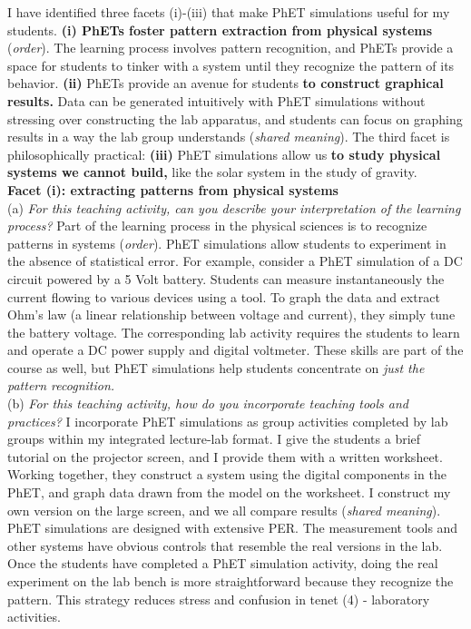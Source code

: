 \documentclass[../../../main.tex]{subfiles}
\begin{document}
I have identified three facets (i)-(iii) that make PhET simulations useful for my students. \textbf{(i) PhETs foster pattern extraction from physical systems} (\textit{order}).  The learning process involves pattern recognition, and PhETs provide a space for students to tinker with a system until they recognize the pattern of its behavior. \textbf{(ii)} PhETs provide an avenue for students \textbf{to construct graphical results.} Data can be generated intuitively with PhET simulations without stressing over constructing the lab apparatus, and students can focus on graphing results in a way the lab group understands (\textit{shared meaning}).  The third facet is philosophically practical: \textbf{(iii)} PhET simulations allow us \textbf{to study physical systems we cannot build,} like the solar system in the study of gravity.
\\
\vspace{0.15cm}
\textbf{Facet (i): extracting patterns from physical systems}
\\
\vspace{0.15cm}
(a) \textit{For this teaching activity, can you describe your interpretation of the learning process?} Part of the learning process in the physical sciences is to recognize patterns in systems (\textit{order}).  PhET simulations allow students to experiment in the absence of statistical error.  For example, consider a PhET simulation of a DC circuit powered by a 5 Volt battery.  Students can measure instantaneously the current flowing to various devices using a tool.  To graph the data and extract Ohm's law (a linear relationship between voltage and current), they simply tune the battery voltage.  The corresponding lab activity requires the students to learn and operate a DC power supply and digital voltmeter.  These skills are part of the course as well, but PhET simulations help students concentrate on \textit{just the pattern recognition.}
\\
\vspace{0.15cm}
(b) \textit{For this teaching activity, how do you incorporate teaching tools and practices?}  I incorporate PhET simulations as group activities completed by lab groups within my integrated lecture-lab format.  I give the students a brief tutorial on the projector screen, and I provide them with a written worksheet.  Working together, they construct a system using the digital components in the PhET, and graph data drawn from the model on the worksheet.  I construct my own version on the large screen, and we all compare results (\textit{shared meaning}).  PhET simulations are designed with extensive PER.  The measurement tools and other systems have obvious controls that resemble the real versions in the lab.  Once the students have completed a PhET simulation activity, doing the real experiment on the lab bench is more straightforward because they recognize the pattern.  This strategy reduces stress and confusion in tenet (4) - laboratory activities.
\end{document}
